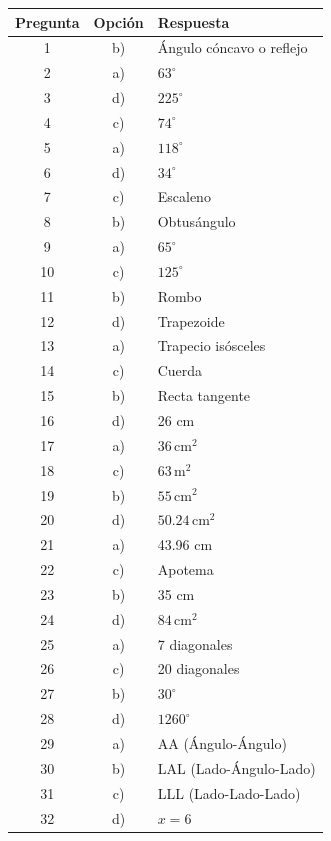 \begin{center}
\begin{tabular}{|c|c|l|}
\hline
\textbf{Pregunta} & \textbf{Opción} & \textbf{Respuesta} \\ \hline
1  & b) & Ángulo cóncavo o reflejo \\ \hline
2  & a) & $63^\circ$ \\ \hline
3  & d) & $225^\circ$ \\ \hline
4  & c) & $74^\circ$ \\ \hline
5  & a) & $118^\circ$ \\ \hline
6  & d) & $34^\circ$ \\ \hline
7  & c) & Escaleno \\ \hline
8  & b) & Obtusángulo \\ \hline
9  & a) & $65^\circ$ \\ \hline
10 & c) & $125^\circ$ \\ \hline
11 & b) & Rombo \\ \hline
12 & d) & Trapezoide \\ \hline
13 & a) & Trapecio isósceles \\ \hline
14 & c) & Cuerda \\ \hline
15 & b) & Recta tangente \\ \hline
16 & d) & 26 cm \\ \hline
17 & a) & $36\,\text{cm}^2$ \\ \hline
18 & c) & $63\,\text{m}^2$ \\ \hline
19 & b) & $55\,\text{cm}^2$ \\ \hline
20 & d) & $50.24\,\text{cm}^2$ \\ \hline
21 & a) & 43.96 cm \\ \hline
22 & c) & Apotema \\ \hline
23 & b) & 35 cm \\ \hline
24 & d) & $84\,\text{cm}^2$ \\ \hline
25 & a) & 7 diagonales \\ \hline
26 & c) & 20 diagonales \\ \hline
27 & b) & $30^\circ$ \\ \hline
28 & d) & $1260^\circ$ \\ \hline
29 & a) & AA (Ángulo-Ángulo) \\ \hline
30 & b) & LAL (Lado-Ángulo-Lado) \\ \hline
31 & c) & LLL (Lado-Lado-Lado) \\ \hline
32 & d) & $x=6$ \\ \hline
\end{tabular}
\end{center}